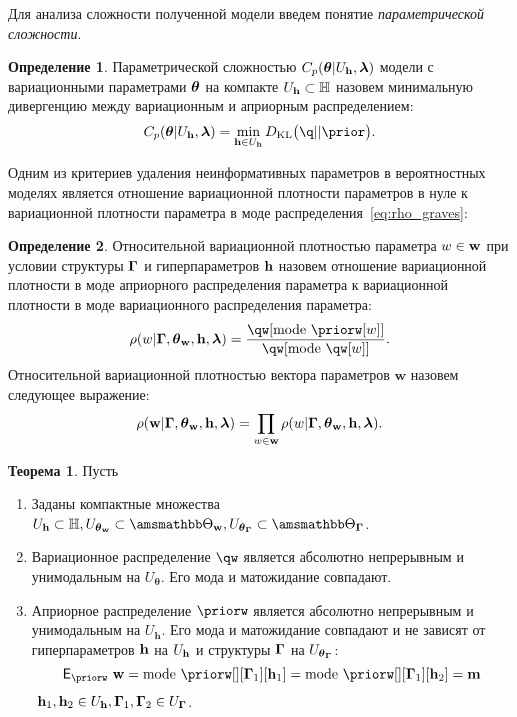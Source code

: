 \documentclass[11pt, a5paper]{dissert}
\theoremstyle{definition}
\newtheorem{theorem}{Теорема}
\newtheorem{defin}{Определение}
\begin{document}
{Для анализа сложности полученной модели введем понятие \textit{параметрической сложности}. 
\begin{defin} 
Параметрической сложностью  $C_p(\boldsymbol{\theta}|U_{\mathbf{h}}, \boldsymbol{\lambda})$ модели с вариационными параметрами $\boldsymbol{\theta}$ на компакте $U_{\mathbf{h}} \subset \mathbb{H}$ назовем минимальную дивергенцию между вариационным и априорным распределением:
\[
C_p(\teta|\Uh, \lam) = \min_{\h \in \Uh} \KL{\q}{\prior}.
\]
\end{defin}

Одним из критериев удаления неинформативных параметров в вероятностных моделях является отношение вариационной плотности параметров в нуле к вариационной плотности параметра в моде распределения~\eqref{eq:rho_graves}:
\begin{defin}
Относительной вариационной   плотностью параметра $w \in \mathbf{w}$  при условии структуры $\boldsymbol{\Gamma}$ и гиперпараметров $\mathbf{h}$ назовем отношение вариационной плотности в моде априорного распределения параметра к вариационной плотности в моде вариационного распределения параметра:
\[
\rho(w|\G,\tetaw, \h,\lam)=\frac{\qw[\text{mode}~\priorw[w]]}{\qw[\text{mode}~{\qw[w]}]}.
\]
Относительной вариационной плотностью вектора параметров $\mathbf{w}$ назовем следующее выражение:
\begin{equation}
\label{eq:rho_general}
    {\rho}(\mathbf{w}|\boldsymbol{\Gamma}, \boldsymbol{\theta}_\mathbf{w}, \mathbf{h},\boldsymbol{\lambda}) = \prod_{w \in \mathbf{w}}\rho(w|\boldsymbol{\Gamma},\boldsymbol{\theta}_\mathbf{w},\mathbf{h},\boldsymbol{\lambda}).
\end{equation}

\end{defin}

\begin{theorem}
Пусть
\begin{enumerate}

\item Заданы компактные множества $\Uh \subset \Hb, \Utetaw \subset \Tetawb, \UtetaG \subset \TetaGb$.

\item Вариационное распределение $\qw$  является абсолютно непрерывным и унимодальным на  $U_{\boldsymbol{\theta}}$.
Его мода и матожидание совпадают.




\item Априорное распределение $\priorw$ является абсолютно непрерывным и унимодальным на  $U_\mathbf{h}$. Его мода и матожидание совпадают и не зависят от гиперпараметров $\mathbf{h}$  на $U_{\mathbf{h}}$ и структуры $\boldsymbol{\Gamma}$ на $U_{\boldsymbol{\theta}_{\boldsymbol{\Gamma}}}$:
\[
\E_{\priorw}~\w = \text{mode}~\priorw[][\G_1][\h_1]=\text{mode}~\priorw[][\G_1][\h_2]=\mathbf{m}
\]
$~\mathbf{h}_1,\mathbf{h}_2 \in U_{\mathbf{h}}, \boldsymbol{\Gamma}_1,\boldsymbol{\Gamma}_2 \in U_{\boldsymbol{\Gamma}}$.



\end{enumerate}
\end{theorem}}
\end{document}
